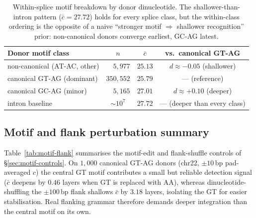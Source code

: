 \documentclass{article}
\theoremstyle{plain}
\theoremstyle{definition}
\theoremstyle{remark}
\begin{document}
\begin{table}[!htbp]
\caption{Within-splice motif breakdown by donor dinucleotide. The
shallower-than-intron pattern ($\bar c\!=\!27.72$) holds for every
splice class, but the within-class ordering is the opposite of a naive
``stronger motif $\Rightarrow$ shallower recognition'' prior:
non-canonical donors converge earliest, GC-AG latest.}
\label{tab:splice-canonical}
\centering
\small
\begin{tabular}{@{}lccc@{}}
\toprule
Donor motif class & $n$ & $\bar c$ & vs.\ canonical GT-AG \\
\midrule
non-canonical (AT-AC, other) & $\phantom{00}5{,}977$ & $25.13$ & $d\approx -0.05$ (shallower) \\
canonical GT-AG (dominant)   & $350{,}552$ & $25.79$ & --- (reference) \\
canonical GC-AG (minor)      & $\phantom{00}5{,}165$ & $27.01$ & $d\approx +0.10$ (deeper) \\
\midrule
intron baseline              & $\sim\!10^7$           & $27.72$ & --- (deeper than every class) \\
\bottomrule
\end{tabular}
\end{table}

\subsection{Motif and flank perturbation summary}
\label{app:motif-flank}

Table~\ref{tab:motif-flank} summarises the motif-edit and flank-shuffle
controls of \S\ref{sec:motif-controls}. On $1{,}000$ canonical GT-AG
donors (chr22, $\pm 10$\,bp pad-averaged $c$) the central GT motif
contributes a small but reliable detection signal ($\bar c$ deepens by
$0.46$ layers when GT is replaced with AA), whereas dinucleotide-shuffling
the $\pm 100$\,bp flank shallows $\bar c$ by $3.18$ layers, isolating the
GT for easier stabilisation. Real flanking grammar therefore demands
deeper integration than the central motif on its own.
\end{document}
